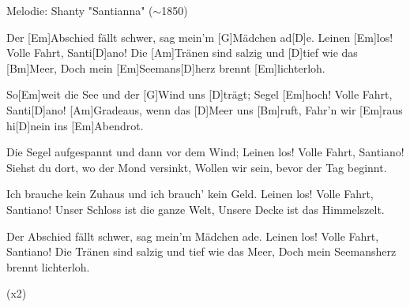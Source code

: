 {\color{gray}Melodie: Shanty "Santianna" {\small($\sim$1850)}}


\begin{guitar}
	Der [Em]Abschied fällt schwer, sag mein'm [G]Mädchen ad[D]e.
	Leinen [Em]los! Volle Fahrt, Santi[D]ano!
	Die [Am]Tränen sind salzig und [D]tief wie das [Bm]Meer,
	Doch mein [Em]Seemans[D]herz brennt [Em]lichterloh.
	
	So[Em]weit die See und der [G]Wind uns [D]trägt;
	Segel [Em]hoch! Volle Fahrt, Santi[D]ano!
	[Am]Gradeaus, wenn das [D]Meer uns [Bm]ruft,
	Fahr'n wir [Em]raus hi[D]nein ins [Em]Abendrot.
	
	Die Segel aufgespannt und dann vor dem Wind;
	Leinen los! Volle Fahrt, Santiano!
	Siehst du dort, wo der Mond versinkt,
	Wollen wir sein, bevor der Tag beginnt.
	
	 
	
	Ich brauche kein Zuhaus und ich brauch' kein Geld.
	Leinen los! Volle Fahrt, Santiano!
	Unser Schloss ist die ganze Welt,
	Unsere Decke ist das Himmelszelt.
	
	 
	
	Der Abschied fällt schwer, sag mein'm Mädchen ade.
	Leinen los! Volle Fahrt, Santiano!
	Die Tränen sind salzig und tief wie das Meer,
	Doch mein Seemansherz brennt lichterloh.
	
	  (x2)
\end{guitar}